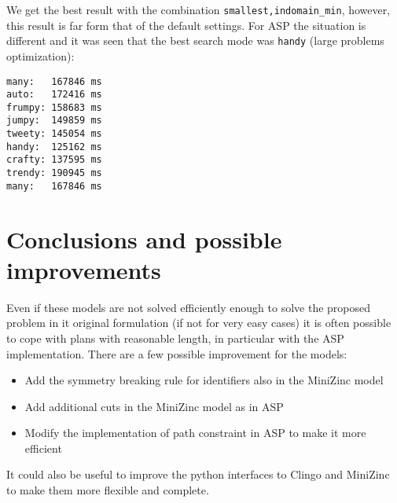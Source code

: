 \documentclass[11pt]{article}
\begin{document}
We get the best result with the combination \verb+smallest,indomain_min+, however, this result is far form that of the default settings.
For ASP the situation is different and it was seen that the best search mode was \verb+handy+ (large problems optimization):
\begin{verbatim}
many:   167846 ms
auto:   172416 ms
frumpy: 158683 ms
jumpy:  149859 ms
tweety: 145054 ms
handy:  125162 ms
crafty: 137595 ms
trendy: 190945 ms
many:   167846 ms
\end{verbatim}
\section{Conclusions and possible improvements}
Even if these models are not solved efficiently enough to solve the proposed problem in it original formulation (if not for very easy cases) 
it is often possible to cope with plans with reasonable length, in particular with the ASP implementation. 
There are a few possible improvement for the models:
\begin{itemize}
\item Add the symmetry breaking rule for identifiers also in the MiniZinc model
\item Add additional cuts in the MiniZinc model as in ASP
\item Modify the implementation of path constraint in ASP to make it more efficient 
\end{itemize} 
It could also be useful to improve the python interfaces to Clingo and MiniZinc to make them more flexible and complete.
\end{document}
